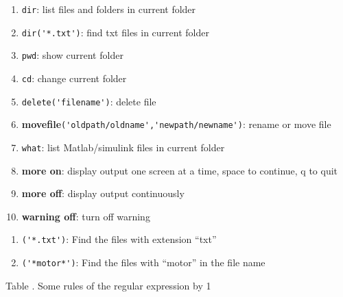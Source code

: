 \documentclass[8pt]{innovativeinnovation-cheatsheet}
\newcommand{\myinline}[1]{{\color{innoinnored}\bfseries\ttfamily{#1}}}
\begin{document}
\begin{multicols*}{3}



\begin{enumerate}[label=$\bullet$,leftmargin=*,nosep]
    \item \lstinline!dir!: list files and folders in current folder
    \item \lstinline!dir('*.txt')!: find txt files in current folder
    \item \lstinline!pwd!: show current folder
    \item \lstinline!cd!:  change current folder
    \item \lstinline!delete('filename')!: delete file
    \item {\color{innoinnored}\bfseries\ttfamily movefile}\lstinline{('oldpath/oldname','newpath/newname')}: rename or move file    
    \item \lstinline!what!: list Matlab/simulink files in current folder
    \item {\color{innoinnored}\bfseries\ttfamily more on}: display output one screen at a time, space to continue, q to quit
    \item {\color{innoinnored}\bfseries\ttfamily more off}: display output continuously
    \item {\color{innoinnored}\bfseries\ttfamily warning off}: turn off warning
\end{enumerate}



\begin{enumerate}[label=$\bullet$,leftmargin=*,nosep]
    \item \myinline{dir}\verb|('*.txt')|: Find the files with extension ``txt''
    \item \myinline{dir}\verb|('*motor*')|: Find the files with ``motor'' in the file name
\end{enumerate}


\begin{center}
Table \the\mytablecount. Some rules of the regular expression
\advance\mytablecount by 1


\end{center}
\end{multicols*}
\end{document}
